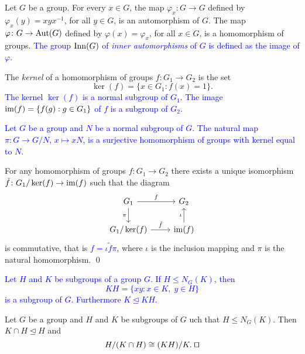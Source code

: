 \begin{example}
	Let $G$ be a group. For every $x\in G$, the map $\varphi_x\colon G\rightarrow G$ defined by $\varphi_x(y)=xyx^{-1}$, for all $y\in G$, is an automorphism of $G$. The map $\varphi\colon G\rightarrow \operatorname{Aut}(G)$ defined by $\varphi(x)=\varphi_x$, for all $x\in G$, is a homomorphism of groups. 
    \textcolor{blue}{The group $\mathrm{Inn}(G)$ of {\em inner automorphisms} of $G$ is defined as the 
	image of $\varphi$.}
\end{example}

The {\em kernel} of a homomorphism of groups $f\colon G_1\rightarrow G_2$ is the set
\[
\ker (f)=\{ x\in G_1: f(x)=1\}.
\]
\textcolor{blue}{The kernel $\ker(f)$ is a normal 
subgroup of $G_1$. The image $\operatorname{im}(f)=\{f(g):g\in G_1\}$ 
of $f$ is a subgroup of $G_2$.}

\begin{example}
\textcolor{blue}{
Let $G$ be a group and $N$ be a normal subgroup of $G$. 
The natural map $\pi\colon G\rightarrow G/N$, $x\mapsto xN$, is a surjective homomorphism of groups with kernel equal to $N$.}
\end{example}

\begin{theorem}
	For any homomorphism of groups $f\colon G_1\rightarrow G_2$ there exists a unique isomorphism $\tilde f\colon G_1/\ker(f)\rightarrow\operatorname{im}(f)$ such that the diagram
	\[\begin{tikzcd}
		{G_1} & {G_2} \\
		{G_1/\ker(f)} & {\im(f)}
		\arrow["f", from=1-1, to=1-2]
		\arrow["{\pi}"', from=1-1, to=2-1]
		\arrow["{\iota}", from=2-2, to=1-2]
		\arrow["{\tilde f}", from=2-1, to=2-2]
	\end{tikzcd}
	\]
	is commutative, that is \textcolor{blue}{$f=\iota\tilde f\pi$}, 
	where $\iota$ is the inclusion mapping and $\pi$ is the natural homomorphism. \qed	
\end{theorem} 
 
\textcolor{blue}{
Let $H$ and $K$ be subgroups of a group $G$. If $H\leq N_G(K)$, 
then \[
KH=\{xy: x\in K,\; y\in H\}
\]
is a subgroup of $G$. Furthermore $K\unlhd KH$.}

\begin{theorem}
	Let $G$ be a group and $H$ and $K$ be subgroups of $G$ 
	uch that $H\leq N_G(K)$. Then $K\cap H\unlhd H$ and
	\[
	H/(K\cap H)\cong (KH)/K.\;\qed
	\]
\end{theorem}

